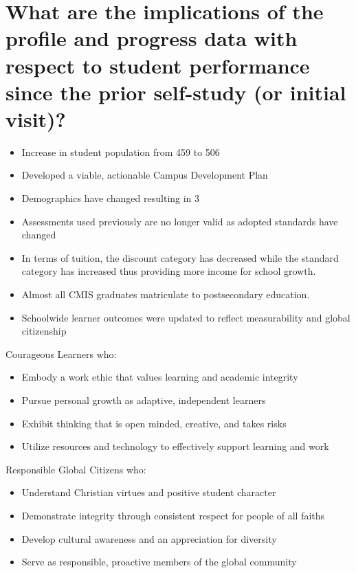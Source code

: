 \section{What are the implications of the profile and progress data with respect to student performance since the prior self-study (or initial visit)?}

\begin{itemize}
\item Increase in student population from 459 to 506
\item Developed a viable, actionable Campus Development Plan
\item Demographics have changed resulting in 3%
\item Assessments used previously are no longer valid as adopted standards have changed
\item In terms of tuition, the discount category has decreased while the standard category has increased thus providing more income for school growth.
\item Almost all CMIS graduates matriculate to postsecondary education. 
\item Schoolwide learner outcomes were updated to reflect measurability and global citizenship
\end{itemize}

Courageous Learners who: 
\begin{itemize}
\item Embody a work ethic that values learning and academic integrity
\item Pursue personal growth as adaptive, independent learners
\item Exhibit thinking that is open minded, creative, and takes risks
\item Utilize resources and technology to effectively support learning and work
\end{itemize}

Responsible Global Citizens who:
\begin{itemize}
\item Understand Christian virtues and positive student character 
\item Demonstrate integrity through consistent respect for people of all faiths
\item Develop cultural awareness and an appreciation for diversity
\item Serve as responsible, proactive members of the global community
\end{itemize}

